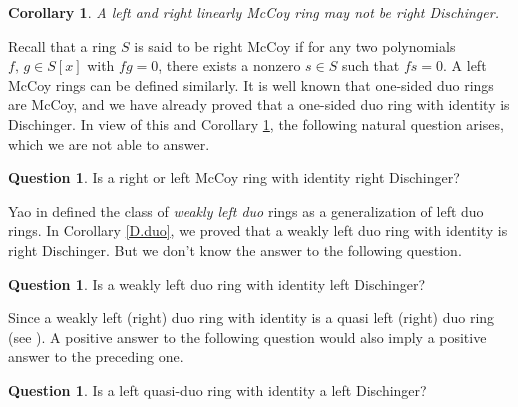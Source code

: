 \documentclass[12pt]{article}
\theoremstyle{plain}
\newtheorem{cor}[thm]{Corollary}
\theoremstyle{definition}
\newtheorem{question}[thm]{Question}
\begin{document}
	\begin{cor}\label{D.lmccoy}
		A left and right linearly McCoy ring may not be right Dischinger.
	\end{cor}
	Recall that a ring $S$ is said to be right McCoy if for any two polynomials $f,\,g\in S[x]$ with $fg = 0$, there exists a nonzero $s\in S$ such that $fs=0$. A left McCoy rings can be defined similarly. It is well known that one-sided duo rings are McCoy, and we have already proved that a one-sided duo ring with identity is Dischinger. In view of this and Corollary \ref{D.lmccoy}, the following natural question arises, which we are not able to answer.
	\begin{question}
		Is a right or left McCoy ring with identity right Dischinger?
	\end{question} 
	Yao in \cite{Yao} defined the class of \emph{weakly left duo} rings as a generalization of left duo rings. In Corollary \ref{D.duo}, we proved that a weakly left duo ring with identity is right Dischinger. But we don't know the answer to the following question.
	\begin{question}
		Is a weakly left duo ring with identity left Dischinger?	
	\end{question}
	Since a weakly left (right) duo ring with identity is a quasi left (right) duo ring (see \cite[Proposition 2.2]{Yu}). A positive answer to the following question would also imply a positive answer to the preceding one.
	\begin{question}
		Is a left quasi-duo ring with identity a left Dischinger?	
	\end{question}
	
\end{document}
